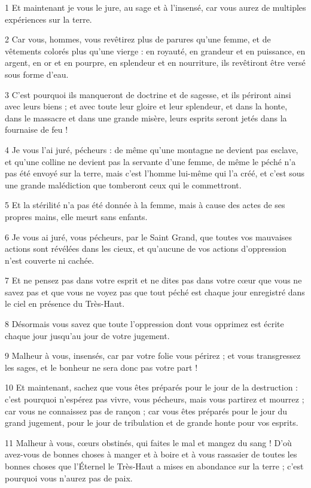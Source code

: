 \par 1 Et maintenant je vous le jure, au sage et à l'insensé, car vous aurez de multiples expériences sur la terre.
\par 2 Car vous, hommes, vous revêtirez plus de parures qu'une femme, et de vêtements colorés plus qu'une vierge : en royauté, en grandeur et en puissance, en argent, en or et en pourpre, en splendeur et en nourriture, ils revêtiront être versé sous forme d'eau.
\par 3 C'est pourquoi ils manqueront de doctrine et de sagesse, et ils périront ainsi avec leurs biens ; et avec toute leur gloire et leur splendeur, et dans la honte, dans le massacre et dans une grande misère, leurs esprits seront jetés dans la fournaise de feu !
\par 4 Je vous l'ai juré, pécheurs : de même qu'une montagne ne devient pas esclave, et qu'une colline ne devient pas la servante d'une femme, de même le péché n'a pas été envoyé sur la terre, mais c'est l'homme lui-même qui l'a créé, et c'est sous une grande malédiction que tomberont ceux qui le commettront.
\par 5 Et la stérilité n'a pas été donnée à la femme, mais à cause des actes de ses propres mains, elle meurt sans enfants.
\par 6 Je vous ai juré, vous pécheurs, par le Saint Grand, que toutes vos mauvaises actions sont révélées dans les cieux, et qu'aucune de vos actions d'oppression n'est couverte ni cachée.
\par 7 Et ne pensez pas dans votre esprit et ne dites pas dans votre cœur que vous ne savez pas et que vous ne voyez pas que tout péché est chaque jour enregistré dans le ciel en présence du Très-Haut.
\par 8 Désormais vous savez que toute l'oppression dont vous opprimez est écrite chaque jour jusqu'au jour de votre jugement.
\par 9 Malheur à vous, insensés, car par votre folie vous périrez ; et vous transgressez les sages, et le bonheur ne sera donc pas votre part !
\par 10 Et maintenant, sachez que vous êtes préparés pour le jour de la destruction : c'est pourquoi n'espérez pas vivre, vous pécheurs, mais vous partirez et mourrez ; car vous ne connaissez pas de rançon ; car vous êtes préparés pour le jour du grand jugement, pour le jour de tribulation et de grande honte pour vos esprits.
\par 11 Malheur à vous, cœurs obstinés, qui faites le mal et mangez du sang ! D'où avez-vous de bonnes choses à manger et à boire et à vous rassasier de toutes les bonnes choses que l'Éternel le Très-Haut a mises en abondance sur la terre ; c'est pourquoi vous n'aurez pas de paix.
